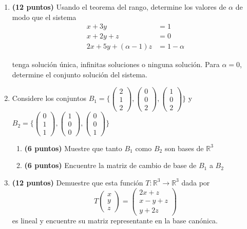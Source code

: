 \documentclass[a4paper]{article}
\begin{document}
\begin{enumerate}
    \item {\bf (12 puntos)} Usando el teorema del rango, determine los valores de $\alpha$ de modo que el sistema
    \begin{align*}
 x + 3y &= 1 \\
 x + 2y +z &= 0\\
2 x + 5y +(\alpha -1) z &= 1-\alpha 
\end{align*}

    tenga solución única, infinitas soluciones o ninguna solución. Para $\alpha=0$, determine el conjunto soluci\'on del sistema.


\newpage 

\item Considere los conjuntos $B_1= \{ \begin{pmatrix} 2 \\ 1 \\ 2 \end{pmatrix}, \begin{pmatrix} 0 \\ 0 \\ 2 \end{pmatrix}, \begin{pmatrix} 1 \\ 0 \\ 2 \end{pmatrix} \}$ y $B_2= \{ \begin{pmatrix} 0 \\ 1 \\ 1 \end{pmatrix}, \begin{pmatrix} 1 \\ 0 \\ 0 \end{pmatrix}, \begin{pmatrix} 0 \\ 0 \\ 1 \end{pmatrix} \} $
\begin{enumerate}
    \item {\bf (6 puntos)} Muestre que tanto $B_1$ como $B_2$ son bases de $\mathbb{R}^3$
    \item {\bf (6 puntos)} Encuentre la matriz de cambio de base de $B_1$ a $B_2$
\end{enumerate}

\newpage

\item {\bf (12 puntos)} Demuestre que esta función $T: \mathbb{R}^{3} \to \mathbb{R}^{3}$ dada por $${T \begin{pmatrix} x \\ y \\ z \end{pmatrix} = \begin{pmatrix}
    2x+z \\ x-y+z \\ y+2z
\end{pmatrix}}$$
 es lineal y encuentre su matriz representante en la base canónica.


\end{enumerate}
\end{document}
